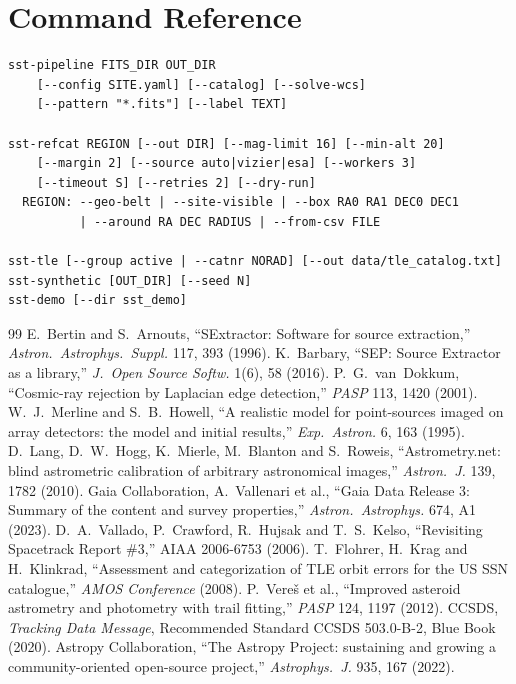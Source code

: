 \documentclass[11pt,a4paper]{article}
\begin{document}
\section{Command Reference}

\noindent\begin{minipage}{\linewidth}
\begin{lstlisting}
sst-pipeline FITS_DIR OUT_DIR
    [--config SITE.yaml] [--catalog] [--solve-wcs]
    [--pattern "*.fits"] [--label TEXT]

sst-refcat REGION [--out DIR] [--mag-limit 16] [--min-alt 20]
    [--margin 2] [--source auto|vizier|esa] [--workers 3]
    [--timeout S] [--retries 2] [--dry-run]
  REGION: --geo-belt | --site-visible | --box RA0 RA1 DEC0 DEC1
          | --around RA DEC RADIUS | --from-csv FILE

sst-tle [--group active | --catnr NORAD] [--out data/tle_catalog.txt]
sst-synthetic [OUT_DIR] [--seed N]
sst-demo [--dir sst_demo]
\end{lstlisting}
\end{minipage}\par

\begin{thebibliography}{99}
\small
{} E.~Bertin and S.~Arnouts, ``SExtractor: Software for source extraction,''
  \emph{Astron.\ Astrophys.\ Suppl.} 117, 393 (1996).
 K.~Barbary, ``SEP: Source Extractor as a library,''
  \emph{J.\ Open Source Softw.} 1(6), 58 (2016).
 P.~G.~van~Dokkum, ``Cosmic-ray rejection by Laplacian edge detection,''
  \emph{PASP} 113, 1420 (2001).
 W.~J.~Merline and S.~B.~Howell, ``A realistic model for point-sources imaged on
  array detectors: the model and initial results,'' \emph{Exp.\ Astron.} 6, 163 (1995).
 D.~Lang, D.~W.~Hogg, K.~Mierle, M.~Blanton and S.~Roweis, ``Astrometry.net: blind
  astrometric calibration of arbitrary astronomical images,'' \emph{Astron.\ J.} 139, 1782 (2010).
 Gaia Collaboration, A.~Vallenari et al., ``Gaia Data Release 3: Summary of the
  content and survey properties,'' \emph{Astron.\ Astrophys.} 674, A1 (2023).
 D.~A.~Vallado, P.~Crawford, R.~Hujsak and T.~S.~Kelso, ``Revisiting Spacetrack
  Report \#3,'' AIAA 2006-6753 (2006).
 T.~Flohrer, H.~Krag and H.~Klinkrad, ``Assessment and categorization of TLE orbit
  errors for the US SSN catalogue,'' \emph{AMOS Conference} (2008).
 P.~Vere\v{s} et al., ``Improved asteroid astrometry and photometry with trail
  fitting,'' \emph{PASP} 124, 1197 (2012).
 CCSDS, \emph{Tracking Data Message}, Recommended Standard CCSDS 503.0-B-2,
  Blue Book (2020).
 Astropy Collaboration, ``The Astropy Project: sustaining and growing a
  community-oriented open-source project,'' \emph{Astrophys.\ J.} 935, 167 (2022).
\end{thebibliography}
\end{document}
